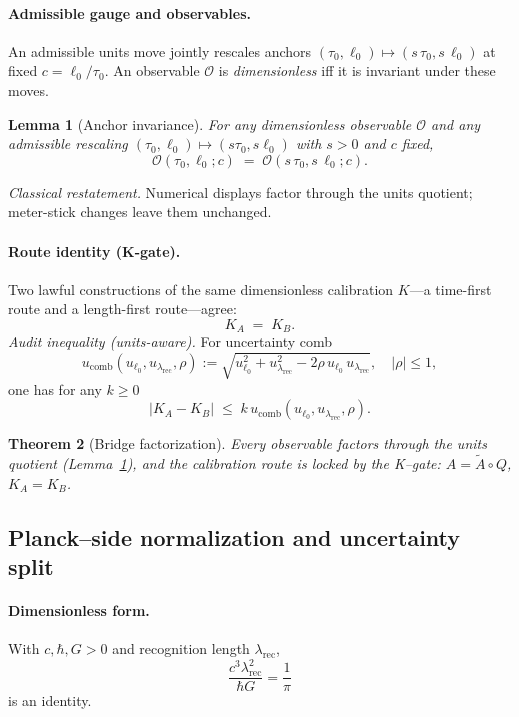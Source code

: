 \documentclass[11pt]{article}
\newtheorem{theorem}{Theorem}[section]
\newtheorem{lemma}[theorem]{Lemma}
\begin{document}
\paragraph{Admissible gauge and observables.}
An admissible units move jointly rescales anchors $(\tau_0,\ell_0)\mapsto(s\,\tau_0,s\,\ell_0)$ at fixed $c=\ell_0/\tau_0$. An observable $\mathcal{O}$ is \emph{dimensionless} iff it is invariant under these moves.

\begin{lemma}[Anchor invariance]\label{lem:anchor-invariance}
For any dimensionless observable $\mathcal{O}$ and any admissible rescaling $(\tau_0,\ell_0)\mapsto(s\tau_0,s\ell_0)$ with $s>0$ and $c$ fixed,
\[
\mathcal{O}(\tau_0,\ell_0;c) \;=\; \mathcal{O}(s\,\tau_0,s\,\ell_0;c).
\]
\end{lemma}
\emph{Classical restatement.} Numerical displays factor through the units quotient; meter-stick changes leave them unchanged.

\paragraph{Route identity (K-gate).}
Two lawful constructions of the same dimensionless calibration $K$---a time-first route and a length-first route---agree:
\[
K_A \;=\; K_B .
\]
\emph{Audit inequality (units-aware).} For uncertainty comb
\[
u_{\mathrm{comb}}(u_{\ell_0},u_{\lambda_{\mathrm{rec}}},\rho)
:= \sqrt{u_{\ell_0}^2 + u_{\lambda_{\mathrm{rec}}}^2 - 2\rho\,u_{\ell_0}\,u_{\lambda_{\mathrm{rec}}}},
\quad |\rho|\le 1,
\]
one has for any $k\ge 0$
\[
\big|K_A - K_B\big| \;\le\; k\,u_{\mathrm{comb}}(u_{\ell_0},u_{\lambda_{\mathrm{rec}}},\rho).
\]
\begin{theorem}[Bridge factorization]\label{thm:factorization}
Every observable factors through the units quotient (Lemma~\ref{lem:anchor-invariance}), and the calibration route is locked by the K–gate: $A=\tilde A\!\circ\!Q$, $K_A=K_B$.
\end{theorem}
%   

\subsection{Planck–side normalization and uncertainty split}\label{subsec:planck-identity}

\paragraph{Dimensionless form.}
With $c,\hbar,G>0$ and recognition length $\lambda_{\mathrm{rec}}$,
\[
\boxed{\frac{c^3\lambda_{\mathrm{rec}}^2}{\hbar G} = \frac{1}{\pi}}
\]
is an identity.
\end{document}
